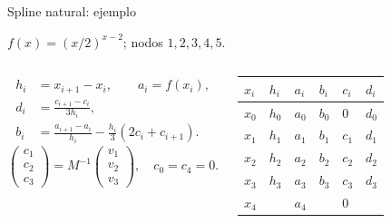 \documentclass[main.tex]{subfiles}
\begin{document}
\begin{frame}[t]{Spline natural: ejemplo}
\par\noindent\begin{minipage}[t][9mm][t]{\textwidth}\small\strut $f(x)=(x/2)^{x-2}$; nodos $1,2,3,4,5$.\end{minipage}\par\nointerlineskip
\begin{columns}[T]\scriptsize\begin{align*}
h_i&=x_{i+1}-x_i,\qquad a_i=f(x_i),\\
d_i&=\frac{c_{i+1}-c_i}{3h_i},\\
b_i&=\frac{a_{i+1}-a_i}{h_i}-\frac{h_i}{3}(2c_i+c_{i+1}).
\end{align*}\scriptsize\[\begin{pmatrix}c_1\\c_2\\c_3\end{pmatrix}=M^{-1}\begin{pmatrix}v_1\\v_2\\v_3\end{pmatrix},\quad c_0=c_4=0.\]\begin{minipage}[t]{\textwidth}\begingroup\scriptsize\setlength{\tabcolsep}{2pt}\begin{center}\begin{tabular}{|C{.12\textwidth}|C{.12\textwidth}|C{.12\textwidth}|C{.12\textwidth}|C{.12\textwidth}|C{.12\textwidth}|}\hline
\rule[-2mm]{0pt}{6mm}$x_i$&$h_i$&$a_i$&$b_i$&$c_i$&$d_i$\\\hline
\rule[-2.5mm]{0pt}{7mm}$x_0$&$h_0$&$a_0$&$b_0$&$0$&$d_0$\\\hline
\rule[-2.5mm]{0pt}{7mm}$x_1$&$h_1$&$a_1$&$b_1$&$c_1$&$d_1$\\\hline
\rule[-2.5mm]{0pt}{7mm}$x_2$&$h_2$&$a_2$&$b_2$&$c_2$&$d_2$\\\hline
\rule[-2.5mm]{0pt}{7mm}$x_3$&$h_3$&$a_3$&$b_3$&$c_3$&$d_3$\\\hline
\rule[-2.5mm]{0pt}{7mm}$x_4$&&$a_4$&&$0$&\\\hline
\end{tabular}\end{center}\endgroup\end{minipage}\par
\end{columns}
\end{frame}
\end{document}
